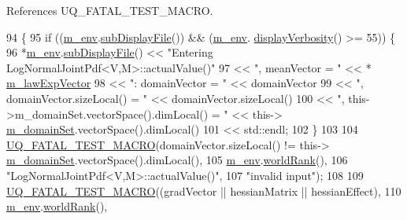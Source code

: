 References U\-Q\-\_\-\-F\-A\-T\-A\-L\-\_\-\-T\-E\-S\-T\-\_\-\-M\-A\-C\-R\-O.


\begin{DoxyCode}
94 \{
95   \textcolor{keywordflow}{if} ((\hyperlink{class_q_u_e_s_o_1_1_base_scalar_function_adf44141aeb765d97613286f88f235f04}{m\_env}.\hyperlink{class_q_u_e_s_o_1_1_base_environment_a8a0064746ae8dddfece4229b9ad374d6}{subDisplayFile}()) && (\hyperlink{class_q_u_e_s_o_1_1_base_scalar_function_adf44141aeb765d97613286f88f235f04}{m\_env}.
      \hyperlink{class_q_u_e_s_o_1_1_base_environment_a1fe5f244fc0316a0ab3e37463f108b96}{displayVerbosity}() >= 55)) \{
96     *\hyperlink{class_q_u_e_s_o_1_1_base_scalar_function_adf44141aeb765d97613286f88f235f04}{m\_env}.\hyperlink{class_q_u_e_s_o_1_1_base_environment_a8a0064746ae8dddfece4229b9ad374d6}{subDisplayFile}() << \textcolor{stringliteral}{"Entering LogNormalJointPdf<V,M>::actualValue()"}
97                             << \textcolor{stringliteral}{", meanVector = "}               << *
      \hyperlink{class_q_u_e_s_o_1_1_log_normal_joint_pdf_a1373e1737c3198b852fab05c77abea35}{m\_lawExpVector}
98                             << \textcolor{stringliteral}{": domainVector = "}             << domainVector
99                             << \textcolor{stringliteral}{", domainVector.sizeLocal() = "} << domainVector.sizeLocal()
100                             << \textcolor{stringliteral}{", this->m\_domainSet.vectorSpace().dimLocal() = "} << this->
      \hyperlink{class_q_u_e_s_o_1_1_base_scalar_function_a67696e86211197938c72cd11863f5cf8}{m\_domainSet}.vectorSpace().dimLocal()
101                             << std::endl;
102   \}
103 
104   \hyperlink{_defines_8h_a56d63d18d0a6d45757de47fcc06f574d}{UQ\_FATAL\_TEST\_MACRO}(domainVector.sizeLocal() != this->
      \hyperlink{class_q_u_e_s_o_1_1_base_scalar_function_a67696e86211197938c72cd11863f5cf8}{m\_domainSet}.vectorSpace().dimLocal(),
105                       \hyperlink{class_q_u_e_s_o_1_1_base_scalar_function_adf44141aeb765d97613286f88f235f04}{m\_env}.\hyperlink{class_q_u_e_s_o_1_1_base_environment_a78b57112bbd0e6dd0e8afec00b40ffa7}{worldRank}(),
106                       \textcolor{stringliteral}{"LogNormalJointPdf<V,M>::actualValue()"},
107                       \textcolor{stringliteral}{"invalid input"});
108 
109   \hyperlink{_defines_8h_a56d63d18d0a6d45757de47fcc06f574d}{UQ\_FATAL\_TEST\_MACRO}((gradVector || hessianMatrix || hessianEffect),
110                       \hyperlink{class_q_u_e_s_o_1_1_base_scalar_function_adf44141aeb765d97613286f88f235f04}{m\_env}.\hyperlink{class_q_u_e_s_o_1_1_base_environment_a78b57112bbd0e6dd0e8afec00b40ffa7}{worldRank}(),

\end{DoxyCode}
